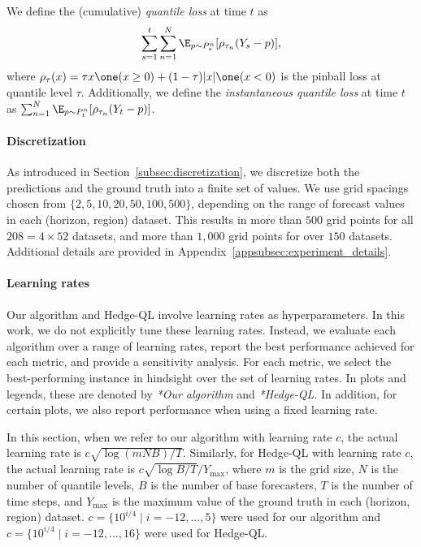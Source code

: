 We define the (cumulative) \textit{quantile loss} at time $t$ as
\[
\sum_{s=1}^t \sum_{n=1}^N \E_{p \sim P_s^n} [\rho_{\tau_n}(Y_s - p)],
\]
where $\rho_{\tau}(x) = \tau x \one(x \geq 0) + (1-\tau) |x| \one(x < 0)$ is the pinball loss at quantile level $\tau$. Additionally, we define the \textit{instantaneous quantile loss} at time $t$ as $\sum_{n=1}^N \E_{p \sim P_t^n} [\rho_{\tau_n}(Y_t - p)]$.

\paragraph{Discretization}
As introduced in Section~\ref{subsec:discretization}, we discretize both the predictions and the ground truth into a finite set of values. We use grid spacings chosen from $\{2,5,10,20,50,100,500\}$, depending on the range of forecast values in each (horizon, region) dataset. This results in more than $500$ grid points for all $208 = 4 \times 52$ datasets, and more than $1{,}000$ grid points for over $150$ datasets. Additional details are provided in Appendix~\ref{appsubsec:experiment_details}.

\paragraph{Learning rates}
Our algorithm and Hedge-QL involve learning rates as hyperparameters. In this work, we do not explicitly tune these learning rates. Instead, we evaluate each algorithm over a range of learning rates, report the best performance achieved for each metric, and provide a sensitivity analysis. For each metric, we select the best-performing instance in hindsight over the set of learning rates. In plots and legends, these are denoted by \textit{*Our algorithm} and \textit{*Hedge-QL}. In addition, for certain plots, we also report performance when using a fixed learning rate. 

In this section, when we refer to our algorithm with learning rate $c$, the actual learning rate is $c \sqrt{\log (mNB) / T}$. Similarly, for Hedge-QL with learning rate $c$, the actual learning rate is $c \sqrt{\log B / T}/Y_{\text{max}}$, where $m$ is the grid size, $N$ is the number of quantile levels, $B$ is the number of base forecasters, $T$ is the number of time steps, and $Y_{\text{max}}$ is the maximum value of the ground truth in each (horizon, region) dataset. $c=\{10^{i/4} \mid i=-12,...,5 \}$ were used for our algorithm and $c=\{10^{i/4} \mid i=-12,...,16\}$ were used for Hedge-QL. 

